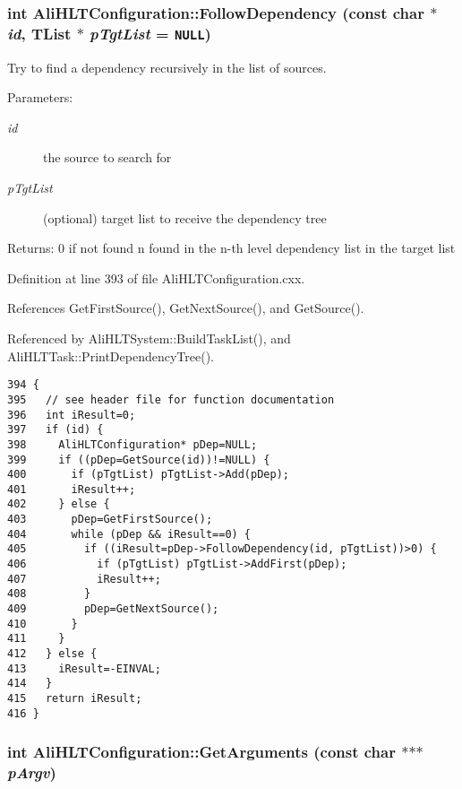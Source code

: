 \subsubsection{\setlength{\rightskip}{0pt plus 5cm}int Ali\-HLTConfiguration::Follow\-Dependency (const char $\ast$ {\em id}, TList $\ast$ {\em p\-Tgt\-List} = {\tt NULL})}\label{classAliHLTConfiguration_a9}


Try to find a dependency recursively in the list of sources. \begin{Desc}
\item[Parameters:]
\begin{description}
\item[{\em id}]the source to search for \item[{\em p\-Tgt\-List}](optional) target list to receive the dependency tree \end{description}
\end{Desc}
\begin{Desc}
\item[Returns:]0 if not found n found in the n-th level dependency list in the target list \end{Desc}


Definition at line 393 of file Ali\-HLTConfiguration.cxx.

References Get\-First\-Source(), Get\-Next\-Source(), and Get\-Source().

Referenced by Ali\-HLTSystem::Build\-Task\-List(), and Ali\-HLTTask::Print\-Dependency\-Tree().

\footnotesize\begin{verbatim}394 {
395   // see header file for function documentation
396   int iResult=0;
397   if (id) {
398     AliHLTConfiguration* pDep=NULL;
399     if ((pDep=GetSource(id))!=NULL) {
400       if (pTgtList) pTgtList->Add(pDep);
401       iResult++;
402     } else {
403       pDep=GetFirstSource();
404       while (pDep && iResult==0) {
405         if ((iResult=pDep->FollowDependency(id, pTgtList))>0) {
406           if (pTgtList) pTgtList->AddFirst(pDep);
407           iResult++;
408         }
409         pDep=GetNextSource();
410       }
411     }
412   } else {
413     iResult=-EINVAL;
414   }
415   return iResult;
416 }
\end{verbatim}\normalsize 


\subsubsection{\setlength{\rightskip}{0pt plus 5cm}int Ali\-HLTConfiguration::Get\-Arguments (const char $\ast$$\ast$$\ast$ {\em p\-Argv})}\label{classAliHLTConfiguration_a16}


